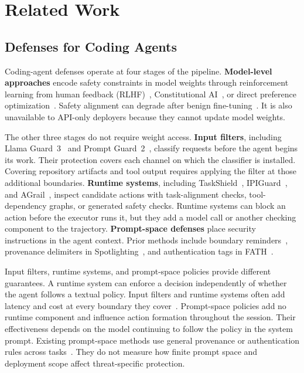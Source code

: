 \section{Related Work}
\label{sec:related}

\subsection{Defenses for Coding Agents}
\label{sec:rel-intervene}

Coding-agent defenses operate at four stages of the pipeline. \textbf{Model-level approaches} encode safety constraints in model weights through reinforcement learning from human feedback (RLHF)~\cite{ouyang2022training}, Constitutional AI~\cite{bai2022constitutional}, or direct preference optimization~\cite{rafailov2024dpo}. Safety alignment can degrade after benign fine-tuning~\cite{qi2023finetuning,he2024what}. It is also unavailable to API-only deployers because they cannot update model weights.

The other three stages do not require weight access. \textbf{Input filters}, including Llama Guard~3~\cite{metallamaguard3} and Prompt Guard~2~\cite{metapromptguard2025}, classify requests before the agent begins its work. Their protection covers each channel on which the classifier is installed. Covering repository artifacts and tool output requires applying the filter at those additional boundaries. \textbf{Runtime systems}, including TaskShield~\cite{jia2025task}, IPIGuard~\cite{an2025ipiguard}, and AGrail~\cite{luo2025agrail}, inspect candidate actions with task-alignment checks, tool-dependency graphs, or generated safety checks. Runtime systems can block an action before the executor runs it, but they add a model call or another checking component to the trajectory. \textbf{Prompt-space defenses} place security instructions in the agent context. Prior methods include boundary reminders~\cite{yi2025benchmarking}, provenance delimiters in Spotlighting~\cite{hines2024defending}, and authentication tags in FATH~\cite{wang2024fath}.

Input filters, runtime systems, and prompt-space policies provide different guarantees. A runtime system can enforce a decision independently of whether the agent follows a textual policy. Input filters and runtime systems often add latency and cost at every boundary they cover~\cite{metallamaguard3,metapromptguard2025,luo2025agrail}. Prompt-space policies add no runtime component and influence action formation throughout the session. Their effectiveness depends on the model continuing to follow the policy in the system prompt. Existing prompt-space methods use general provenance or authentication rules across tasks~\cite{yi2025benchmarking,hines2024defending,wang2024fath}. They do not measure how finite prompt space and deployment scope affect threat-specific protection.

